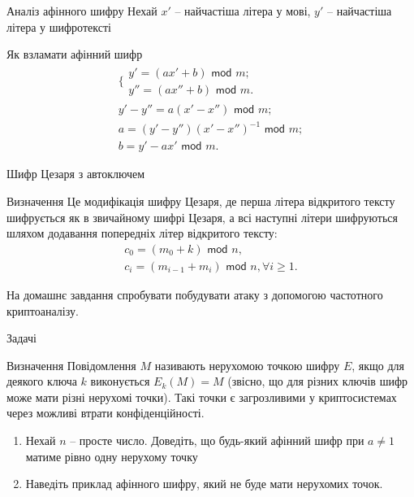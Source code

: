 \documentclass{../zkdl-presentation-template}
\begin{document}
\begin{frame}{Аналіз афінного шифру}
Нехай $x'$ -- найчастіша літера у мові, $y'$ -- найчастіша літера у шифротексті
\begin{exampleblock}{Як взламати афінний шифр}
    \begin{gather*}
        \Big\{ \begin{array}{l} 
        y'=(ax'+b)\textsf{ mod } m;  \\
        y''=(ax''+b)\textsf{ mod } m.
        \end{array} \\
        y'-y''=a(x'-x'')\textsf{ mod } m;\\
        a=( y'-y'')(x'-x'')^{-1}\textsf{ mod } m;\\
        b=y'-ax'\textsf{ mod } m.
    \end{gather*}
\end{exampleblock}
    
\end{frame}

\begin{frame}{Шифр Цезаря з автоключем}
\begin{exampleblock}{Визначення}
    Це модифікація шифру Цезаря, де перша літера відкритого тексту шифрується як в звичайному шифрі Цезаря, а всі наступні літери шифруються шляхом додавання попередніх літер відкритого тексту:
    \begin{gather*}
        c_0=(m_0+k)\textsf{ mod }n, \\
        c_i=(m_{i-1}+m_i)\textsf{ mod } n, \forall i\geq1.
    \end{gather*}
\end{exampleblock}
\begin{block}{}
    На домашнє завдання спробувати побудувати атаку з допомогою частотного криптоаналізу.
\end{block}
    
\end{frame}

\begin{frame}{Задачі}
\begin{exampleblock}{Визначення}
    Повідомлення $M$ називають нерухомою точкою шифру $E$, якщо для деякого ключа $k$ виконується $E_k(M)=M$ (звісно, що для різних ключів шифр може мати різні нерухомі точки). Такі точки є загрозливими у криптосистемах через можливі втрати конфіденційності.
\end{exampleblock}
\begin{block}{}
    \begin{enumerate}
        \item Нехай $n$ -- просте число. Доведіть, що будь-який афінний шифр при $a\neq 1$ матиме рівно одну нерухому точку 
        \item Наведіть приклад афінного шифру, який не буде мати нерухомих точок.
    \end{enumerate}
\end{block}

\end{frame}
\end{document}
